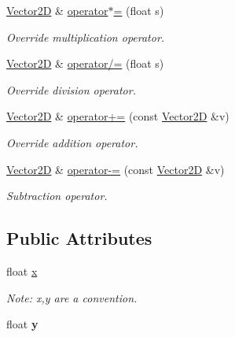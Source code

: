 \begin{DoxyCompactItemize}
\mbox{\hyperlink{struct_vector2_d}{Vector2D}} \& \mbox{\hyperlink{struct_vector2_d_a815fe748cc2d626d7df98e5399759982}{operator$\ast$=}} (float s)
\begin{DoxyCompactList}\small\item\em Override multiplication operator. \end{DoxyCompactList}\item 
\mbox{\label{struct_vector2_d_a90938864ecf48b3a128b390007c7d20e}} 
\mbox{\hyperlink{struct_vector2_d}{Vector2D}} \& \mbox{\hyperlink{struct_vector2_d_a90938864ecf48b3a128b390007c7d20e}{operator/=}} (float s)
\begin{DoxyCompactList}\small\item\em Override division operator. \end{DoxyCompactList}\item 
\mbox{\label{struct_vector2_d_a49c69f8e9a323a89307387c37ce5424d}} 
\mbox{\hyperlink{struct_vector2_d}{Vector2D}} \& \mbox{\hyperlink{struct_vector2_d_a49c69f8e9a323a89307387c37ce5424d}{operator+=}} (const \mbox{\hyperlink{struct_vector2_d}{Vector2D}} \&v)
\begin{DoxyCompactList}\small\item\em Override addition operator. \end{DoxyCompactList}\item 
\mbox{\label{struct_vector2_d_a71321e79ebef52a996536ff4dc19de65}} 
\mbox{\hyperlink{struct_vector2_d}{Vector2D}} \& \mbox{\hyperlink{struct_vector2_d_a71321e79ebef52a996536ff4dc19de65}{operator-\/=}} (const \mbox{\hyperlink{struct_vector2_d}{Vector2D}} \&v)
\begin{DoxyCompactList}\small\item\em Subtraction operator. \end{DoxyCompactList}\end{DoxyCompactItemize}
\subsection*{Public Attributes}
\begin{DoxyCompactItemize}
\item 
float \mbox{\hyperlink{struct_vector2_d_aeb4253ba6555251d010ea4450619029e}{x}}
\begin{DoxyCompactList}\small\item\em Note\+: x,y are a convention. \end{DoxyCompactList}\item 
\mbox{\label{struct_vector2_d_a85215519d3f71d0e6be7d636346f3b7d}} 
float {\bfseries y}
\end{DoxyCompactItemize}


